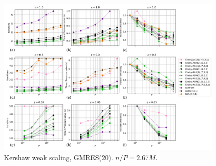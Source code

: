 \begin{frame}
  \begin{figure}
    \centering
    \includegraphics[width=\textwidth]{../figs/kershaw-weak-scaling.png}
    \vspace*{-1cm}
    \captionsetup{labelformat=empty}
    \caption{
        \small
        Kershaw weak scaling, GMRES(20).
        $n/P = 2.67M$.
        \label{fig:kershaw-weak-scaling}
    }
  \end{figure}
\end{frame}